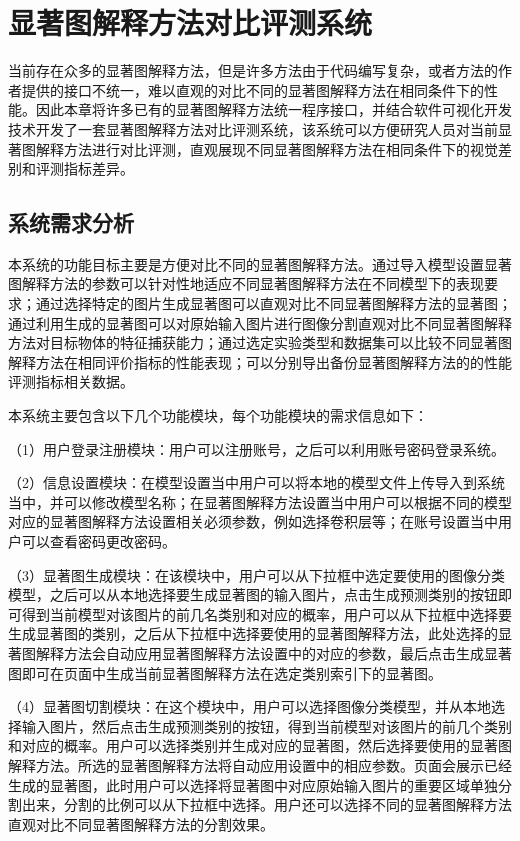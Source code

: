 \chapter{显著图解释方法对比评测系统}
\thispagestyle{others}
\pagestyle{others}
\xiaosi




当前存在众多的显著图解释方法，但是许多方法由于代码编写复杂，或者方法的作者提供的接口不统一，难以直观的对比不同的显著图解释方法在相同条件下的性能。因此本章将许多已有的显著图解释方法统一程序接口，并结合软件可视化开发技术开发了一套显著图解释方法对比评测系统，该系统可以方便研究人员对当前显著图解释方法进行对比评测，直观展现不同显著图解释方法在相同条件下的视觉差别和评测指标差异。

\section{系统需求分析}

本系统的功能目标主要是方便对比不同的显著图解释方法。通过导入模型设置显著图解释方法的参数可以针对性地适应不同显著图解释方法在不同模型下的表现要求；通过选择特定的图片生成显著图可以直观对比不同显著图解释方法的显著图；通过利用生成的显著图可以对原始输入图片进行图像分割直观对比不同显著图解释方法对目标物体的特征捕获能力；通过选定实验类型和数据集可以比较不同显著图解释方法在相同评价指标的性能表现；可以分别导出备份显著图解释方法的的性能评测指标相关数据。

本系统主要包含以下几个功能模块，每个功能模块的需求信息如下： 

（1）用户登录注册模块：用户可以注册账号，之后可以利用账号密码登录系统。
 
 （2）信息设置模块：在模型设置当中用户可以将本地的模型文件上传导入到系统当中，并可以修改模型名称；在显著图解释方法设置当中用户可以根据不同的模型对应的显著图解释方法设置相关必须参数，例如选择卷积层等；在账号设置当中用户可以查看密码更改密码。

 （3）显著图生成模块：在该模块中，用户可以从下拉框中选定要使用的图像分类模型，之后可以从本地选择要生成显著图的输入图片，点击生成预测类别的按钮即可得到当前模型对该图片的前几名类别和对应的概率，用户可以从下拉框中选择要生成显著图的类别，之后从下拉框中选择要使用的显著图解释方法，此处选择的显著图解释方法会自动应用显著图解释方法设置中的对应的参数，最后点击生成显著图即可在页面中生成当前显著图解释方法在选定类别索引下的显著图。
 
 （4）显著图切割模块：在这个模块中，用户可以选择图像分类模型，并从本地选择输入图片，然后点击生成预测类别的按钮，得到当前模型对该图片的前几个类别和对应的概率。用户可以选择类别并生成对应的显著图，然后选择要使用的显著图解释方法。所选的显著图解释方法将自动应用设置中的相应参数。页面会展示已经生成的显著图，此时用户可以选择将显著图中对应原始输入图片的重要区域单独分割出来，分割的比例可以从下拉框中选择。用户还可以选择不同的显著图解释方法直观对比不同显著图解释方法的分割效果。
 
